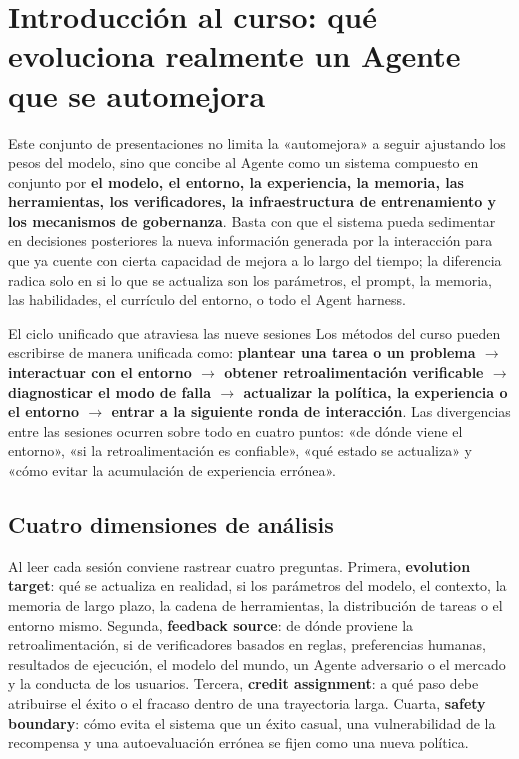 \section{Introducción al curso: qué evoluciona realmente un Agente que se automejora}

Este conjunto de presentaciones no limita la «automejora» a seguir ajustando los pesos del modelo, sino que concibe al Agente como un sistema compuesto en conjunto por \textbf{el modelo, el entorno, la experiencia, la memoria, las herramientas, los verificadores, la infraestructura de entrenamiento y los mecanismos de gobernanza}. Basta con que el sistema pueda sedimentar en decisiones posteriores la nueva información generada por la interacción para que ya cuente con cierta capacidad de mejora a lo largo del tiempo; la diferencia radica solo en si lo que se actualiza son los parámetros, el prompt, la memoria, las habilidades, el currículo del entorno, o todo el Agent harness.

\begin{importantbox}{El ciclo unificado que atraviesa las nueve sesiones}
Los métodos del curso pueden escribirse de manera unificada como: \textbf{plantear una tarea o un problema $\rightarrow$ interactuar con el entorno $\rightarrow$ obtener retroalimentación verificable $\rightarrow$ diagnosticar el modo de falla $\rightarrow$ actualizar la política, la experiencia o el entorno $\rightarrow$ entrar a la siguiente ronda de interacción}. Las divergencias entre las sesiones ocurren sobre todo en cuatro puntos: «de dónde viene el entorno», «si la retroalimentación es confiable», «qué estado se actualiza» y «cómo evitar la acumulación de experiencia errónea».
\end{importantbox}

\subsection{Cuatro dimensiones de análisis}

Al leer cada sesión conviene rastrear cuatro preguntas. Primera, \textbf{evolution target}: qué se actualiza en realidad, si los parámetros del modelo, el contexto, la memoria de largo plazo, la cadena de herramientas, la distribución de tareas o el entorno mismo. Segunda, \textbf{feedback source}: de dónde proviene la retroalimentación, si de verificadores basados en reglas, preferencias humanas, resultados de ejecución, el modelo del mundo, un Agente adversario o el mercado y la conducta de los usuarios. Tercera, \textbf{credit assignment}: a qué paso debe atribuirse el éxito o el fracaso dentro de una trayectoria larga. Cuarta, \textbf{safety boundary}: cómo evita el sistema que un éxito casual, una vulnerabilidad de la recompensa y una autoevaluación errónea se fijen como una nueva política.

